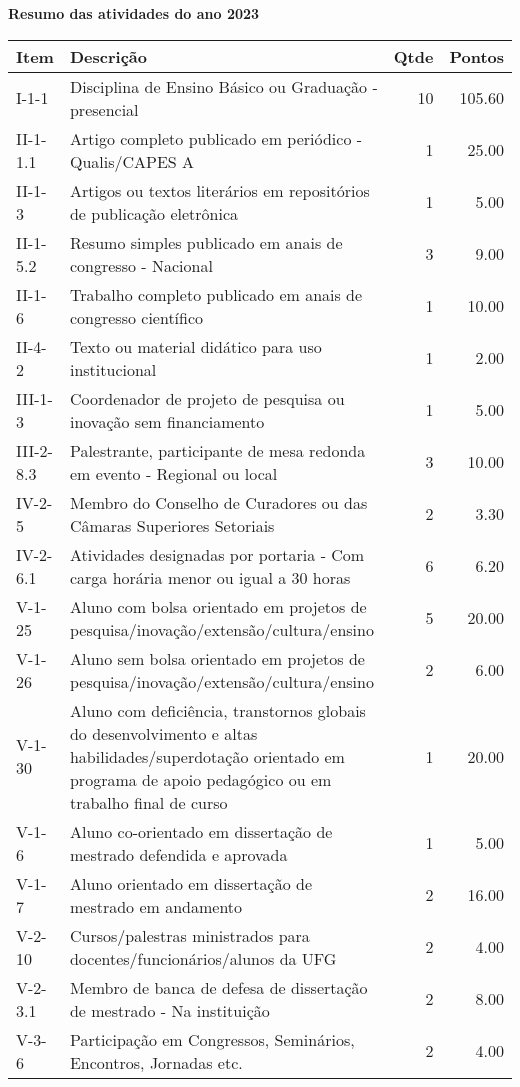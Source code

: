 \documentclass[11pt,a4paper]{article}
\begin{document}
\begin{center}
\large \textbf{
Resumo das atividades do ano 2023
}
\end{center}
\vspace{-0.5cm}
\begin{table}[ht]
\centering
\begin{tabular}{|l|p{12cm}|r|r|}
  \hline
{\textbf{Item}} & {\textbf{Descrição}} & {\textbf{Qtde}} & {\textbf{Pontos}} \\ 
  \hline
I-1-1 & Disciplina de Ensino Básico ou Graduação - presencial &  10 & 105.60 \\ 
  II-1-1.1 & Artigo completo publicado em periódico - Qualis/CAPES A &   1 & 25.00 \\ 
  II-1-3 & Artigos ou textos literários em repositórios de publicação eletrônica &   1 & 5.00 \\ 
  II-1-5.2 & Resumo simples publicado em anais de congresso - Nacional &   3 & 9.00 \\ 
  II-1-6 & Trabalho completo publicado em anais de congresso científico &   1 & 10.00 \\ 
  II-4-2 & Texto ou material didático para uso institucional &   1 & 2.00 \\ 
  III-1-3 & Coordenador de projeto de pesquisa ou inovação sem financiamento &   1 & 5.00 \\ 
  III-2-8.3 & Palestrante, participante de mesa redonda em evento - Regional ou local &   3 & 10.00 \\ 
  IV-2-5 & Membro do Conselho de Curadores ou das Câmaras Superiores Setoriais &   2 & 3.30 \\ 
  IV-2-6.1 & Atividades designadas por portaria - Com carga horária menor ou igual a 30 horas &   6 & 6.20 \\ 
  V-1-25 & Aluno com bolsa orientado em projetos de pesquisa/inovação/extensão/cultura/ensino &   5 & 20.00 \\ 
  V-1-26 & Aluno sem bolsa orientado em projetos de pesquisa/inovação/extensão/cultura/ensino &   2 & 6.00 \\ 
  V-1-30 & Aluno com deficiência, transtornos globais do desenvolvimento e altas habilidades/superdotação orientado em programa de apoio pedagógico ou em trabalho final de curso &   1 & 20.00 \\ 
  V-1-6 & Aluno co-orientado em dissertação de mestrado defendida e aprovada &   1 & 5.00 \\ 
  V-1-7 & Aluno orientado em dissertação de mestrado em andamento &   2 & 16.00 \\ 
  V-2-10 & Cursos/palestras ministrados para docentes/funcionários/alunos da UFG &   2 & 4.00 \\ 
  V-2-3.1 & Membro de banca de defesa de dissertação de mestrado - Na instituição &   2 & 8.00 \\ 
  V-3-6 & Participação em Congressos, Seminários, Encontros, Jornadas etc. &   2 & 4.00 \\ 
   \hline
\end{tabular}
\end{table}
\end{document}
